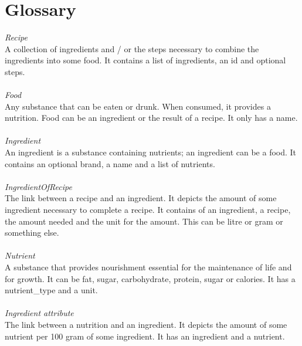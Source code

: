 \section{Glossary}
\textit{Recipe} \\
A collection of ingredients and /  or the steps necessary to combine the ingredients into some food. It contains a list of ingredients, an id and optional steps. \\ \\
\textit{Food} \\
Any substance that can be eaten or drunk. When consumed, it provides a nutrition. Food can be an ingredient or the result of a recipe. It only has a name. \\ \\
\textit{Ingredient} \\
An ingredient is a substance containing nutrients; an ingredient can be a food. It contains an optional brand, a name and a list of nutrients.  \\ \\
\textit{IngredientOfRecipe} \\
The link between a recipe and an ingredient. It depicts the amount of some ingredient necessary to complete a recipe. It contains of an ingredient, a recipe, the amount needed and the unit for the amount. This can be litre or gram or something else.\\ \\
\textit{Nutrient} \\
A substance that provides nourishment essential for the maintenance of life and for growth. It can be fat, sugar, carbohydrate, protein, sugar or calories. It has a nutrient\_type and a unit.  \\ \\
\textit{Ingredient attribute} \\
The link between a nutrition and an ingredient. It depicts the amount of some nutrient per 100 gram of some ingredient. It has an ingredient and a nutrient.\\ \\

